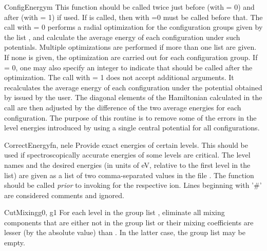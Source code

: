 \begin{fundesc}{ConfigEnergy}{m}
This function should be called twice just before (with  = 0) and after
(with  = 1)  if used. If  is
called, then  with =0 must be called before that.
The call with  = 0 performs a radial optimization for the configuration
groups given by the list , and calculate the average energy of each
configuration under such potentials. Multiple optimizations are performed if
more than one list are given. If none is given, the optimization are carried out
for each configuration group. If  = 0, one may also specify an integer
 to indicate that  should be called after the
optimization. The call with  = 1 does not accept additional arguments. It
recalculates the average energy of each configuration under the potential
obtained by  issued by the user. The diagonal elements
of the Hamiltonian calculated in the  call are then adjusted
by the difference of the two average energies for each configuration. The
purpose of this routine is to remove some of the errors in the level energies
introduced by using a single central potential for all configurations.
\end{fundesc}

\begin{fundesc}{CorrectEnergy}{fn, nele}
Provide exact energies of certain levels. This should be used if
spectroscopically accurate energies of some levels are critical. The level names
and the desired energies (in units of eV, relative to the first level in the
list) are given as a list of two comma-separated values in the file .
The function should be called {\em prior} to invoking  for
the respective ion. Lines beginning with '\#' are considered comments and
ignored.
\end{fundesc}

\begin{fundesc}{CutMixing}{g0, g1}
For each level in the group list , eliminate all mixing components
that are either not in the group list  or their mixing coefficients
are lesser (by the absolute value) than . In the latter case, the group
list  may be empty.
\end{fundesc}

